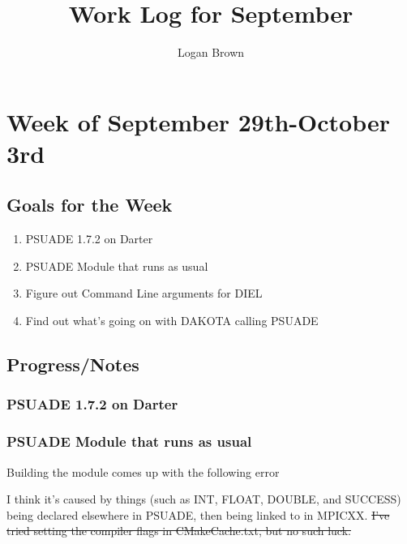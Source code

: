 

\title{Work Log for September}
\author{Logan Brown}


\maketitle


\setcounter{section}{4} %
\setcounter{subsection}{-1}
\setcounter{subsubsection}{0}

\section{Week of September 29th-October 3rd}
\subsection{Goals for the Week}
\begin{enumerate}
	\item PSUADE 1.7.2 on Darter
	\item PSUADE Module that runs as usual
	\item Figure out Command Line arguments for DIEL
	\item Find out what's going on with DAKOTA calling PSUADE
\end{enumerate}



\subsection{Progress/Notes}

\subsubsection{PSUADE 1.7.2 on Darter}


\subsubsection{PSUADE Module that runs as usual}

Building the module comes up with the following error



I think it's caused by things (such as INT, FLOAT, DOUBLE, and SUCCESS) being declared elsewhere in PSUADE, then being linked to in MPICXX. \sout{I've tried setting the compiler flags in CMakeCache.txt, but no such luck.}

